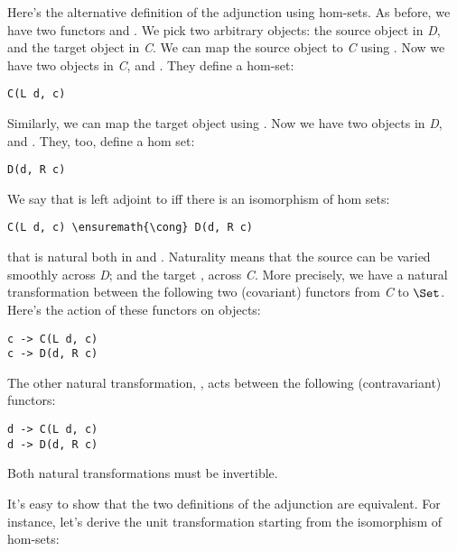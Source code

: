 \noindent
Here's the alternative definition of the adjunction using hom-sets. As
before, we have two functors  and
. We pick two arbitrary objects: the
source object  in \emph{D}, and the target object 
in \emph{C}. We can map the source object  to \emph{C} using
. Now we have two objects in \emph{C},  and
. They define a hom-set:

\begin{Verbatim}[commandchars=\\\{\}]
C(L d, c)
\end{Verbatim}
Similarly, we can map the target object  using . Now
we have two objects in \emph{D},  and . They,
too, define a hom set:

\begin{Verbatim}[commandchars=\\\{\}]
D(d, R c)
\end{Verbatim}
We say that  is left adjoint to  iff there is an
isomorphism of hom sets:

\begin{Verbatim}[commandchars=\\\{\}]
C(L d, c) \ensuremath{\cong} D(d, R c)
\end{Verbatim}
that is natural both in  and .
Naturality means that the source  can be varied smoothly
across \emph{D}; and the target , across \emph{C}. More
precisely, we have a natural transformation  between the
following two (covariant) functors from \emph{C} to $\Set$. Here's
the action of these functors on objects:

\begin{Verbatim}[commandchars=\\\{\}]
c -> C(L d, c)
c -> D(d, R c)
\end{Verbatim}
The other natural transformation, , acts between the following
(contravariant) functors:

\begin{Verbatim}[commandchars=\\\{\}]
d -> C(L d, c)
d -> D(d, R c)
\end{Verbatim}
Both natural transformations must be invertible.

It's easy to show that the two definitions of the adjunction are
equivalent. For instance, let's derive the unit transformation starting
from the isomorphism of hom-sets:

